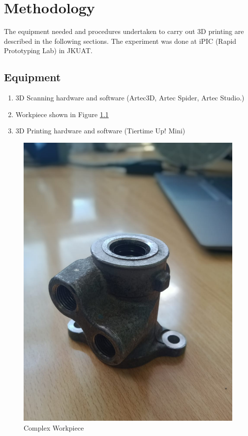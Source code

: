 \chapter{Methodology}
\lhead{\leftmark}
The equipment needed and procedures undertaken to carry out 3D printing are described in the following sections. The experiment was done at iPIC (Rapid Prototyping Lab) in JKUAT.
\section{Equipment}
\begin{enumerate}
\item 3D Scanning hardware and software (Artec3D, Artec Spider, Artec Studio.)
\item Workpiece shown in Figure \ref{fig:3dscan}
\item 3D Printing hardware and software (Tiertime Up! Mini)
\end{enumerate}
\begin{center}
	\begin{figure}[h!]
	\centering
	\includegraphics[width=0.4\linewidth]{Figures/Figure}
	\caption{Complex Workpiece}
	\label{fig:3dscan}
	\end{figure}
\end{center}
\newpage
